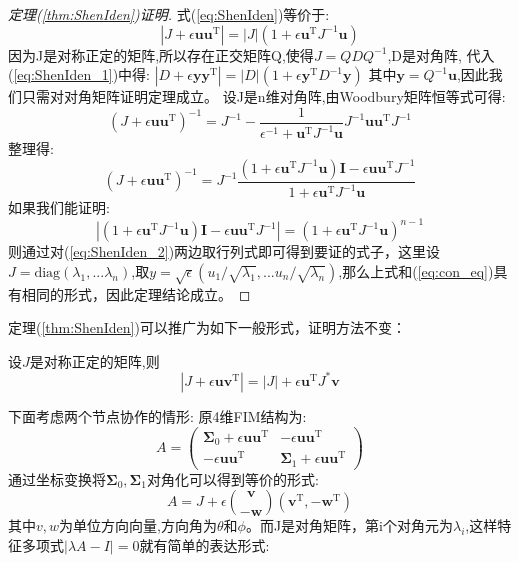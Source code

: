 \begin{proof}[定理(\ref{thm:ShenIden})证明]
式(\ref{eq:ShenIden})等价于:
\begin{equation}\label{eq:ShenIden_1}
|J+\epsilon \bm{u}\bm{u}^{\textrm{T}} |=|J|(1+\epsilon \bm{u}^{\textrm{T}} J^{-1}\bm{u})
\end{equation}
因为J是对称正定的矩阵,所以存在正交矩阵Q,使得$J=QDQ^{-1}$,D是对角阵,
代入(\ref{eq:ShenIden_1})中得:
$|D+\epsilon \bm{y}\bm{y}^{\textrm{T}} |=|D|(1+\epsilon \bm{y}^{\textrm{T}} D^{-1}\bm{y})$
其中$\bm{y}=Q^{-1}\bm{u}$,因此我们只需对对角矩阵证明定理成立。
设J是n维对角阵,由Woodbury矩阵恒等式可得:
\begin{equation}
(J+\epsilon \bm{u}\bm{u}^{\textrm{T}} )^{-1}=J^{-1}-\frac{1}{\epsilon^{-1}+\bm{u}^{\textrm{T}} J^{-1}\bm{u}}J^{-1}\bm{u}\bm{u}^{\textrm{T}} J^{-1}
\end{equation}
整理得:
\begin{equation}\label{eq:ShenIden_2}
(J+\epsilon \bm{u}\bm{u}^{\textrm{T}} )^{-1}=J^{-1}\frac{(1+\epsilon\bm{u}^{\textrm{T}} J^{-1}\bm{u})\bm{I}-\epsilon \bm{u}\bm{u}^{\textrm{T}} J^{-1}}{1+\epsilon\bm{u}^{\textrm{T}} J^{-1}\bm{u}}
\end{equation}
如果我们能证明:
\begin{equation}
|(1+\epsilon\bm{u}^{\textrm{T}} J^{-1}\bm{u})\bm{I}-\epsilon \bm{u}\bm{u}^{\textrm{T}} J^{-1}|=(1+\epsilon\bm{u}^{\textrm{T}} J^{-1}\bm{u})^{n-1}
\end{equation}
则通过对(\ref{eq:ShenIden_2})两边取行列式即可得到要证的式子，这里设$J=\text{diag}(\lambda_1,...\lambda_n)$,取$y=\sqrt{\epsilon}(u_1/\sqrt{\lambda_1},...u_n/\sqrt{\lambda_n})$,那么上式和(\ref{eq:con_eq})具有相同的形式，因此定理结论成立。
\end{proof}
定理(\ref{thm:ShenIden})可以推广为如下一般形式，证明方法不变：
\begin{corollary}设$J$是对称正定的矩阵,则
\begin{equation}
|J+\epsilon \bm{u}\bm{v}^{\textrm{T}} |=|J|+\epsilon \bm{u}^{\textrm{T}} J^*\bm{v}
\end{equation}
\end{corollary}
下面考虑两个节点协作的情形:
原4维FIM结构为:
\begin{equation}
A=\left(\begin{array}{cc}
\bm{\Sigma}_0+\epsilon \bm{u}\bm{u}^{\textrm{T}}  &-\epsilon \bm{u}\bm{u}^{\textrm{T}}  \\
-\epsilon \bm{u}\bm{u}^{\textrm{T}}  & \bm{\Sigma}_1+\epsilon \bm{u}\bm{u}^{\textrm{T}}
\end{array}
\right)
\end{equation}
通过坐标变换将$\bm{\Sigma}_0,\bm{\Sigma}_1$对角化可以得到等价的形式:
\begin{equation}
A=J+\epsilon\binom{\bm{v}}{-\bm{w}}(\bm{v}^{\textrm{T}} ,-\bm{w}^{\textrm{T}} )
\end{equation}
其中$v,w$为单位方向向量,方向角为$\theta$和$\phi$。而J是对角矩阵，第i个对角元为$\lambda_i$,这样特征多项式$|\lambda A-I|=0$就有简单的表达形式:

